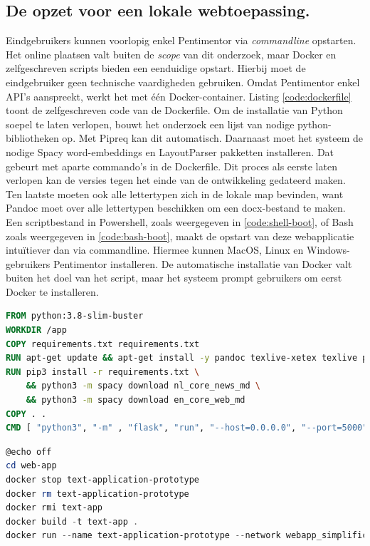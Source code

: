 \subsection{De opzet voor een lokale webtoepassing.}

Eindgebruikers kunnen voorlopig enkel Pentimentor via \textit{commandline} opstarten. Het online plaatsen valt buiten de \textit{scope} van dit onderzoek, maar Docker en zelfgeschreven scripts bieden een eenduidige opstart. Hierbij moet de eindgebruiker geen technische vaardigheden gebruiken. Omdat Pentimentor enkel API's aanspreekt, werkt het met één Docker-container. Listing \ref{code:dockerfile} toont de zelfgeschreven code van de Dockerfile. Om de installatie van Python soepel te laten verlopen, bouwt het onderzoek een lijst van nodige python-bibliotheken op. Met Pipreq kan dit automatisch. Daarnaast moet het systeem de nodige Spacy word-embeddings en LayoutParser pakketten installeren. Dat gebeurt met aparte commando's in de Dockerfile. Dit proces als eerste laten verlopen kan de versies tegen het einde van de ontwikkeling gedateerd maken. Ten laatste moeten ook alle lettertypen zich in de lokale map bevinden, want Pandoc moet over alle lettertypen beschikken om een docx-bestand te maken. Een scriptbestand in Powershell, zoals weergegeven in \ref{code:shell-boot}, of Bash zoals weergegeven in \ref{code:bash-boot}, maakt de opstart van deze webapplicatie intuïtiever dan via commandline. Hiermee kunnen MacOS, Linux en Windows-gebruikers Pentimentor installeren. De automatische installatie van Docker valt buiten het doel van het script, maar het systeem prompt gebruikers om eerst Docker te installeren.

\begin{lstlisting}[language=Dockerfile, caption={Dockerfile voor Pentimentor.}, label={code:dockerfile}]
FROM python:3.8-slim-buster
WORKDIR /app
COPY requirements.txt requirements.txt
RUN apt-get update && apt-get install -y pandoc texlive-xetex texlive poppler-utils
RUN pip3 install -r requirements.txt \
	&& python3 -m spacy download nl_core_news_md \
	&& python3 -m spacy download en_core_web_md
COPY . .	
CMD [ "python3", "-m" , "flask", "run", "--host=0.0.0.0", "--port=5000"]
\end{lstlisting}


\begin{lstlisting}[language=Powershell, caption={Script voor het opstarten van de Docker-container voor Windows-gebruikers}, label={code:shell-boot}]
@echo off
cd web-app
docker stop text-application-prototype
docker rm text-application-prototype
docker rmi text-app
docker build -t text-app .
docker run --name text-application-prototype --network webapp_simplification -d -p 5000:5000 text-app
\end{lstlisting}

